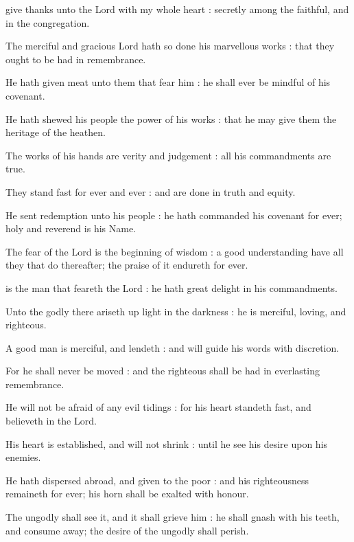
 give thanks unto the Lord with my whole heart : secretly among the faithful, and in the congregation.\par
{}
The merciful and gracious Lord hath so done his marvellous works : that they ought to be had in remembrance.\par
{}He hath given meat unto them that fear him : he shall ever be mindful of his covenant.\par
{}He hath shewed his people the power of his works : that he may give them the heritage of the heathen.\par
{}The works of his hands are verity and judgement : all his commandments are true.\par
{}They stand fast for ever and ever : and are done in truth and equity.\par
{}He sent redemption unto his people : he hath commanded his covenant for ever; holy and reverend is his Name.\par
{}The fear of the Lord is the beginning of wisdom : a good understanding have all they that do thereafter; the praise of it endureth for ever.\par


 is the man that feareth the Lord : he hath great delight in his commandments.\par
{}
Unto the godly there ariseth up light in the darkness : he is merciful, loving, and righteous.\par
{}A good man is merciful, and lendeth : and will guide his words with discretion.\par
{}For he shall never be moved : and the righteous shall be had in everlasting remembrance.\par
{}He will not be afraid of any evil tidings : for his heart standeth fast, and believeth in the Lord.\par
{}His heart is established, and will not shrink : until he see his desire upon his enemies.\par
{}He hath dispersed abroad, and given to the poor : and his righteousness remaineth for ever; his horn shall be exalted with honour.\par
{}The ungodly shall see it, and it shall grieve him : he shall gnash with his teeth, and consume away; the desire of the ungodly shall perish.\par

